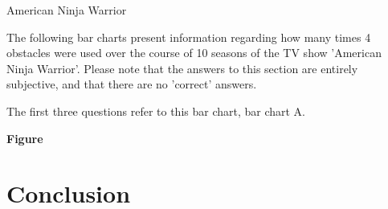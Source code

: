 American Ninja Warrior\newline

The following bar charts present information regarding how many times 4 obstacles were used over the course of 10 seasons of the TV show 'American Ninja Warrior'. Please note that the answers to this section are entirely subjective, and that there are no 'correct' answers.\newline


The first three questions refer to this bar chart, bar chart A.

\textbf{Figure}













\section{Conclusion}
